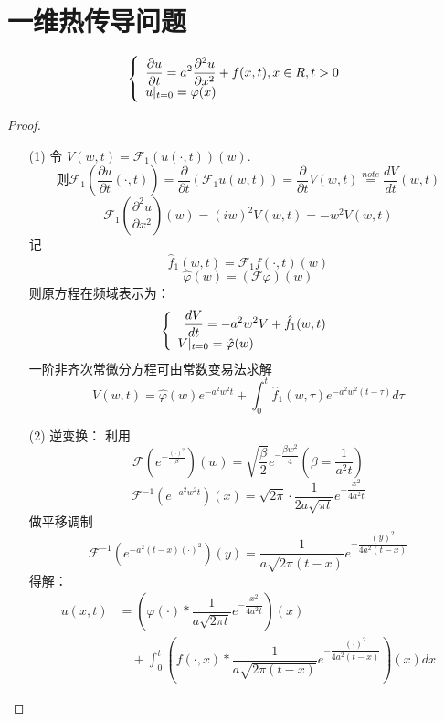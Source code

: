 \documentclass[linespread=1.5,openany]{book}%
\def\R{R}%
\theoremstyle{plain}
\newcommand{\R}{\mathbb{R}}                %
\begin{document}
{{{					\section{一维热传导问题}
					\[\left\{\begin{array}{l}
						\Large \displaystyle\dfrac{\partial u}{\partial t} = a^2\dfrac{\partial^2 u}{\partial x^2} + f(x,t),  x \in \R, t > 0\\
						\Large \displaystyle 	u|_{t=0}  = \varphi(x) \\	
					\end{array}\right.\]
					\begin{proof}
						\begin{itemize}\item [(1)]
							令 \(V(w,t) = \mathcal{F}_1(u(\cdot,t))(w)\).\[
							则\mathcal{F}_1\left(\frac{\partial u}{\partial t}(\cdot,t)\right) = \frac{\partial}{\partial t}(\mathcal{F}_1 u(w,t)) = \frac{\partial}{\partial t}V(w,t) \stackrel{note}{=} \frac{dV}{dt}(w,t) \]\[
							\mathcal{F}_1\left(\frac{\partial^2 u}{\partial x^2}\right)(w) = (iw)^2 V(w,t) = -w^2 V(w,t) \]记\[
							\hat{f}_1(w,t) = \mathcal{F}_1 f(\cdot,t)(w) \label{eq:fourier_f} \]
							\[\hat{\varphi}(w) = (\mathcal{F}\varphi)(w) \]
							则原方程在频域表示为：
							\[\left\{\begin{array}{l}
								\Large \displaystyle\	\frac{dV}{dt} =-a^2 w^2 V +\hat{f}_1(w,t)\\
								\Large \displaystyle V|_{t=0} = \hat{\varphi}(w) \\
								
							\end{array}\right.\]
							一阶非齐次常微分方程可由常数变易法求解
							\[	V(w, t) = \hat{\varphi}(w) e^{-a^2 
								w^2 t} + \int_0^t \hat{f}_1(w, \tau) e^{-a^2 w^2 (t - \tau)} d\tau \]
							\item [(2)]逆变换：
							利用\[	\mathcal{F}\left(e^{-\frac{(\cdot)^2}{\beta } }\right)(w) = \sqrt{\frac{ \beta}{2}} e^{-\dfrac{\beta w^2}{4}}(\beta=\frac{1}{a^2t} )\]
							\[
							\mathcal{F}^{-1}\left(e^{-a^2 w^2 t}\right)(x) = \sqrt{2\pi} \cdot \dfrac{1}{2a\sqrt{\pi t}} e^{-\dfrac{x^2}{4a^2 t}}\]
							做平移调制\[	\mathcal{F}^{-1}\left(e^{-a^2 (t-x)(\cdot)^2 }\right)(y) = \dfrac{1}{a\sqrt{2\pi (t -x)}} e^{-\dfrac{(y)^2}{4a^2 (t -x)}}\]
							得解：
							\begin{equation}
								\begin{aligned}
									u(x, t) &= \left( \varphi(\cdot) * \dfrac{1}{a\sqrt{2\pi t}} e^{-\dfrac{x^2}{4a^2 t}} \right)(x) \\
									&\quad + \int_0^t \left( f(\cdot, x) * \dfrac{1}{a\sqrt{2\pi (t -  x)}} e^{-\dfrac{(\cdot)^2}{4a^2 (t - x)}} \right)(x) dx
								\end{aligned}
							\end{equation}
						\end{itemize}
					\end{proof}
					
}}}
\end{document}
